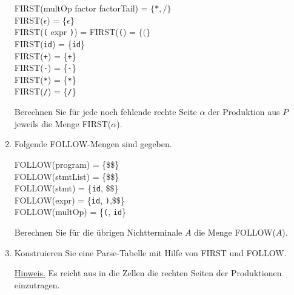 \documentclass{uebungsblatt}
\begin{document}
\begin{aufgabe}
\begin{enumerate}
\medskip
\begin{small}	
FIRST(multOp factor factorTail) = $\{\texttt{*}, \texttt{/}\}$\\	
FIRST($\epsilon$) = \{$\epsilon$\}\\			
FIRST(\texttt{(} expr \texttt{)}) = FIRST(\texttt{(}) = $\{\texttt{(}\}$\\
FIRST(\texttt{id}) = \{\texttt{id}\}\\
FIRST(\texttt{+}) = \{\texttt{+}\}\\
FIRST(\texttt{-}) = \{\texttt{-}\}\\
FIRST(\texttt{*}) = \{\texttt{*}\}\\
FIRST(\texttt{/}) = \{\texttt{/}\}\\
\end{small}

Berechnen Sie für jede noch fehlende rechte Seite $\alpha$ der 
Produktion aus $P$ jeweils die Menge FIRST($\alpha$).\\

\item
Folgende FOLLOW-Mengen sind gegeben.

\medskip
\begin{small}
FOLLOW(program) = \{\$\$\}\\	
FOLLOW(stmtList) = \{\$\$\}\\
FOLLOW(stmt) = \{\texttt{id}, \$\$\}\\
FOLLOW(expr) = \{\texttt{id}, \texttt{)},\$\$\}\\
FOLLOW(multOp) = \{\texttt{(}, \texttt{id}\}
\end{small}

Berechnen Sie für die übrigen Nichtterminale $A$ die Menge FOLLOW($A$). \\
\item
Konstruieren Sie eine Parse-Tabelle mit Hilfe von FIRST und FOLLOW.\\

\smallskip
\underline{Hinweis.}
Es reicht aus in die Zellen die rechten Seiten der Produktionen einzutragen.

\end{enumerate}

\end{aufgabe}
\begin{loesung} 

\end{loesung}
\newpage
\end{document}
